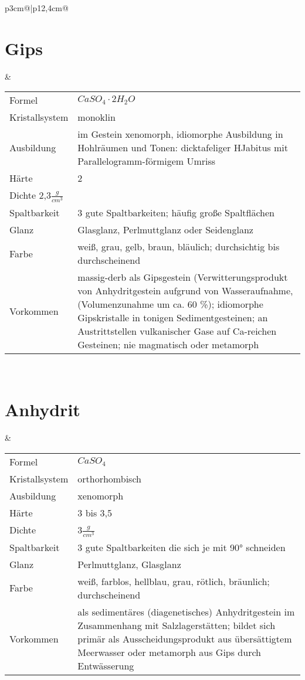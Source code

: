 \documentclass[a4, 12pt]{scrreprt}
\begin{document}
\begin{tabular}{p{3cm}@{}|p{}@{}}
\hline
\section{Gips} & 
	\begin{tabular}{p{3cm}@{}p{9cm}@{}}
	Formel & $CaSO_4 \cdot 2H_2O$\\
	Kristallsystem & monoklin\\
	Ausbildung & im Gestein xenomorph, idiomorphe Ausbildung in Hohlräumen und Tonen: dicktafeliger HJabitus mit Parallelogramm-förmigem Umriss\\
	Härte & 2\\
	Dichte 2,3$\frac{g}{cm^3}$\\
	Spaltbarkeit & 3 gute Spaltbarkeiten; häufig große Spaltflächen\\
	Glanz & Glasglanz, Perlmuttglanz oder Seidenglanz\\
	Farbe & weiß, grau, gelb, braun, bläulich; durchsichtig bis durchscheinend\\
	Vorkommen & massig-derb als Gipsgestein (Verwitterungsprodukt von Anhydritgestein aufgrund von Wasseraufnahme, (Volumenzunahme um ca. 60 \%); idiomorphe Gipskristalle in tonigen Sedimentgesteinen; an Austrittstellen vulkanischer Gase auf Ca-reichen Gesteinen; nie magmatisch oder metamorph\\
	\end{tabular}\\
\hline

\section{Anhydrit} &
	\begin{tabular}{p{3cm}@{}p{9cm}@{}}
	Formel & $CaSO_4$\\
	Kristallsystem & orthorhombisch\\
	Ausbildung & xenomorph \\
	Härte & 3 bis 3,5\\
	Dichte & 3$\frac{g}{cm^3}$\\
	Spaltbarkeit & 3 gute Spaltbarkeiten die sich je mit 90° schneiden\\
	Glanz & Perlmuttglanz, Glasglanz\\
	Farbe & weiß, farblos, hellblau, grau, rötlich, bräunlich; durchscheinend\\
	Vorkommen & als sedimentäres (diagenetisches) Anhydritgestein im Zusammenhang mit Salzlagerstätten; bildet sich primär als Ausscheidungsprodukt aus übersättigtem Meerwasser oder metamorph aus Gips durch Entwässerung\\
	\end{tabular}\\
\hline 


\end{tabular}
\end{document}
